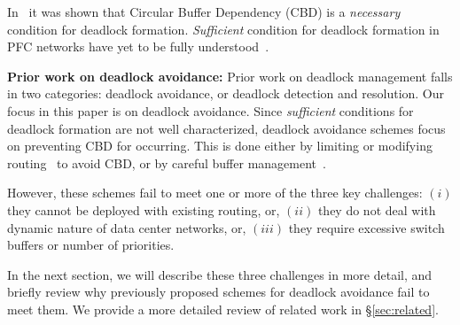 In~\cite{hu2016deadlocks} it was shown that Circular Buffer Dependency (CBD) is a
{\em necessary} condition for deadlock formation. {\em Sufficient} condition for
deadlock formation in PFC networks have yet to be fully
understood~\cite{hu2016deadlocks}. 

{\bf Prior work on deadlock avoidance:} Prior work on deadlock management falls
in two categories: deadlock avoidance, or deadlock detection and resolution. Our
focus in this paper is on deadlock avoidance.  Since {\em sufficient} conditions
for deadlock formation are not well characterized, deadlock avoidance schemes
focus on preventing CBD for occurring. This is done either by limiting or
modifying routing~\cite{tcpbolt} to avoid CBD, or by careful buffer
management~\cite{xxx}. 

However, these schemes fail to meet one or more of the three key challenges:
$(i)$ they cannot be deployed with existing routing, or, $(ii)$ they do not deal
with dynamic nature of data center networks, or, $(iii)$ they require excessive
switch buffers or number of priorities. 

In the next section, we will describe these three challenges in more detail, and
briefly review why previously proposed schemes for deadlock avoidance fail to
meet them. We provide a more detailed review of related work in
\S\ref{sec:related}.

